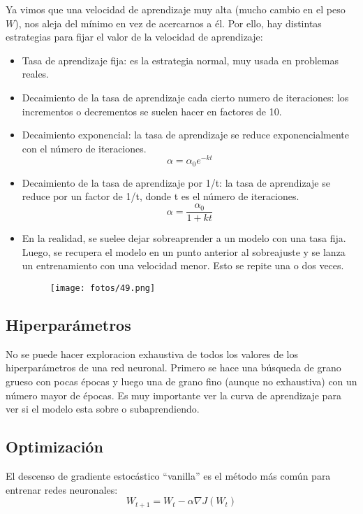 Ya vimos que una velocidad de aprendizaje muy alta (mucho cambio en el peso $W$), nos aleja del mínimo en vez de acercarnos a él. Por ello, hay distintas estrategias para fijar el valor de la velocidad de aprendizaje:
\begin{itemize}
\item Tasa de aprendizaje fija: es la estrategia normal, muy usada en problemas reales.
\item Decaimiento de la tasa de aprendizaje cada cierto numero de iteraciones: los incrementos o decrementos se suelen hacer en factores de 10. 
\item Decaimiento exponencial: la tasa de aprendizaje se reduce exponencialmente con el número de iteraciones.
\begin{equation}
\alpha = \alpha_0 e^{-kt}
\end{equation} 
\item Decaimiento de la tasa de aprendizaje por 1/t: la tasa de aprendizaje se reduce por un factor de 1/t, donde t es el número de iteraciones.
\begin{equation}
\alpha = \frac{\alpha_0}{1 + kt}
\end{equation}
\item En la realidad, se suelee dejar sobreaprender a un modelo con una tasa fija. Luego, se recupera el modelo en un punto anterior al sobreajuste y se lanza un entrenamiento con una velocidad menor. Esto se repite una o dos veces. 
\begin{figure}[H]
\centering
\texttt{[image: fotos/49.png]}
\end{figure}
\end{itemize}

\subsection{Hiperparámetros}

No se puede hacer exploracion exhaustiva de todos los valores de los hiperparámetros de una red neuronal. Primero se hace una búsqueda de grano grueso con pocas épocas y luego una de grano fino (aunque no exhaustiva) con un número mayor de épocas. Es muy importante ver la curva de aprendizaje para ver si el modelo esta sobre o subaprendiendo.

\subsection{Optimización}

\noindent El descenso de gradiente estocástico ``vanilla'' es el método más común para entrenar redes neuronales: 
\begin{equation}
W_{t+1} = W_t - \alpha \nabla J (W_t)
\end{equation}

